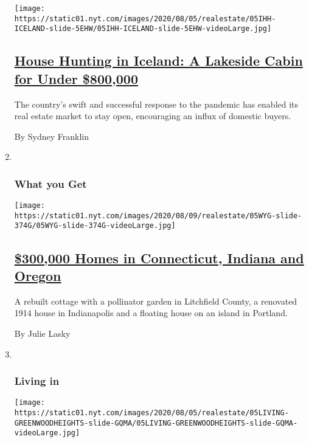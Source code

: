 \begin{enumerate}
  \texttt{[image: https://static01.nyt.com/images/2020/08/05/realestate/05IHH-ICELAND-slide-5EHW/05IHH-ICELAND-slide-5EHW-videoLarge.jpg]}

  \hypertarget{house-hunting-in-iceland-a-lakeside-cabin-for-under-800000}{%
  \subsection{\texorpdfstring{\href{/2020/08/05/realestate/house-hunting-in-iceland-a-lakeside-summer-house-for-773000.html}{House
  Hunting in Iceland: A Lakeside Cabin for Under
  \$800,000}}{House Hunting in Iceland: A Lakeside Cabin for Under \$800,000}}\label{house-hunting-in-iceland-a-lakeside-cabin-for-under-800000}}

  The country's swift and successful response to the pandemic has
  enabled its real estate market to stay open, encouraging an influx of
  domestic buyers.

  By Sydney Franklin
\item ~
  \hypertarget{what-you-get}{%
  \subsubsection{What you Get}\label{what-you-get}}

  \texttt{[image: https://static01.nyt.com/images/2020/08/09/realestate/05WYG-slide-374G/05WYG-slide-374G-videoLarge.jpg]}

  \hypertarget{300000-homes-in-connecticut-indiana-and-oregon}{%
  \subsection{\texorpdfstring{\href{/2020/08/05/realestate/300000-dollar-homes-for-sale-in-ct-or-in.html}{\$300,000
  Homes in Connecticut, Indiana and
  Oregon}}{\$300,000 Homes in Connecticut, Indiana and Oregon}}\label{300000-homes-in-connecticut-indiana-and-oregon}}

  A rebuilt cottage with a pollinator garden in Litchfield County, a
  renovated 1914 house in Indianapolis and a floating house on an island
  in Portland.

  By Julie Lasky
\item ~
  \hypertarget{living-in}{%
  \subsubsection{Living in}\label{living-in}}

  \texttt{[image: https://static01.nyt.com/images/2020/08/05/realestate/05LIVING-GREENWOODHEIGHTS-slide-GQMA/05LIVING-GREENWOODHEIGHTS-slide-GQMA-videoLarge.jpg]}


\end{enumerate}
